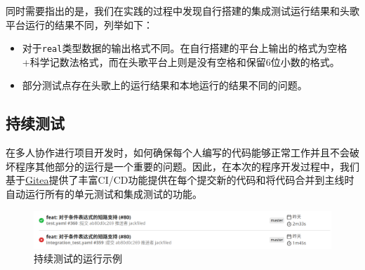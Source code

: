 \documentclass[../main.tex]{subfiles}
\begin{document}
同时需要指出的是，我们在实践的过程中发现自行搭建的集成测试运行结果和头歌平台运行的结果不同，列举如下：
\begin{itemize}
    \item 对于\texttt{real}类型数据的输出格式不同。在自行搭建的平台上输出的格式为空格+科学记数法格式，而在头歌平台上则是没有空格和保留6位小数的格式。
    \item 部分测试点存在头歌上的运行结果和本地运行的结果不同的问题。
\end{itemize}

\subsection{持续测试}

在多人协作进行项目开发时，如何确保每个人编写的代码能够正常工作并且不会破坏程序其他部分的运行是一个重要的问题。因此，在本次的程序开发过程中，我们基于\href{https://gitea.com}{Gitea}提供了丰富CI/CD功能提供在每个提交新的代码和将代码合并到主线时自动运行所有的单元测试和集成测试的功能。

\begin{figure}[htbp]
    \centering
    \includegraphics[width=0.8\linewidth]{assets/持续测试示例.png}
    \caption{持续测试的运行示例}
    \label{fig:continous_test_example}
\end{figure}
\end{document}
